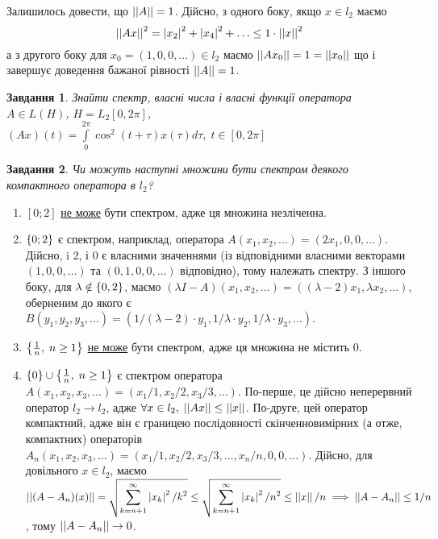 \documentclass[10pt]{article}
\newtheorem{prob}{Завдання}
\let\oldint\int
\renewcommand{\int}{\oldint\limits}
\begin{document}
	Залишилось довести, що $\left|\left|A\right|\right|=1$. Дійсно, з одного боку, якщо $x\in l_2$ маємо
	\[\left|\left|Ax\right|\right|^2=\left|x_2\right|^2+\left|x_4\right|^2+\hdots\leq1\cdot\left|\left|x\right|\right|^2\]
	а з другого боку для $x_0=(1,0,0,\hdots)\in l_2$ маємо
	$\left|\left|Ax_0\right|\right|=1=\left|\left|x_0\right|\right|$
	що і завершує доведення бажаної рівності $\left|\left|A\right|\right|=1$.
\begin{prob}Знайти спектр, власні числа і власні функції оператора $A\in L(H)$, $H=L_2[0,2\pi]$, $(Ax)(t)=\int_0^{2\pi}\cos^2(t+\tau)x(\tau)
	d\tau,\;t\in[0,2\pi]$
\end{prob}
\begin{prob}Чи можуть наступні множини бути спектром деякого компактного оператора в $l_2$?\end{prob}
\begin{enumerate}
	\renewcommand{\labelenumi}{\myralph{enumi})}
\item $[0;2]$ \uline{не може} бути спектром, адже ця множина незліченна.
\item $\left\{0;2\right\}$ є спектром, наприклад, оператора $A(x_1,x_2,\hdots)=(2x_1,0,0,\hdots)$. Дійсно, i 2, і 0 є власними значеннями (із відповідними
	власними векторами $(1,0,0,\hdots)$ та $(0,1,0,0,\hdots)$ відповідно), тому належать спектру. З іншого боку, для $\lambda\notin\left\{0,2\right\}$,
	маємо $(\lambda I-A)(x_1,x_2,\hdots)=((\lambda-2)x_1,\lambda x_2,\hdots)$, оберненим до якого є 
	$B(y_1,y_2,y_3,\hdots)=(1/(\lambda-2)\cdot y_1,1/\lambda\cdot y_2,1/\lambda\cdot y_3,\hdots)$.
\item $\left\{\frac{1}{n},\;n\geq1\right\}$ \uline{не може} бути спектром, адже ця множина не містить 0.
\item $\left\{0\right\}\cup\left\{\frac{1}{n},\;n\geq1\right\}$ є спектром оператора $A(x_1,x_2,x_3,\hdots)=(x_1/1,x_2/2,x_3/3,\hdots)$. По-перше, це дійсно
	неперервний оператор $l_2\to l_2$, адже $\forall x\in l_2,\;\left|\left|Ax\right|\right|\leq\left|\left|x\right|\right|$. По-друге, цей оператор компактний, адже він
	є границею послідовності скінченновимірних (а отже, компактних) операторів $A_n(x_1,x_2,x_3,\hdots)=(x_1/1,x_2/2,x_3/3,\hdots,x_n/n,0,0,
	\hdots)$. Дійсно, для довільного $x\in l_2$, маємо $\mynorm{(A-A_n)(x)}=\sqrt{\sum_{k=n+1}^{\infty}\myabs{x_k}^2/k
	^2}\leq\sqrt{\sum_{k=n+1}^{\infty}\myabs{x_k}^2/n^2}\leq\mynorm{x}/n\implies\mynorm{A-A_n}\leq 1/n$, тому $\left|\left|A-A_n\right|\right|\to0$.


\end{enumerate}
\end{document}
